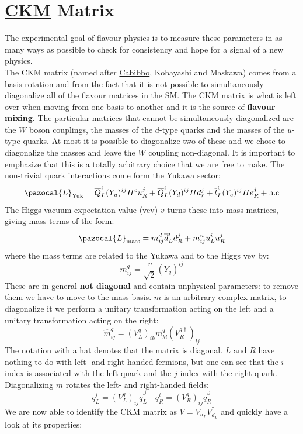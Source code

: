\documentclass[../main.tex]{subfiles}
\begin{document}
\section{\href{https://en.wikipedia.org/wiki/Cabibbo-Kobayashi-Maskawa_matrix}{CKM} Matrix}
The experimental goal of flavour physics is to measure these parameters in as many ways as possible to check for consistency and hope for a signal of a new physics.\\
The CKM matrix (named after \href{https://it.wikipedia.org/wiki/Nicola_Cabibbo}{Cabibbo}, Kobayashi and Maskawa) comes from a basis rotation and from the fact that it is not possible to simultaneously diagonalize all of the flavour matrices in the SM. The CKM matrix is what is left over when moving from one basis to another and it is the source of \textbf{flavour mixing}. The
particular matrices that cannot be simultaneously diagonalized are the $W$ boson couplings, the masses of the $d$-type quarks and the masses of the $u$-type quarks. At most it is possible to diagonalize two of these and we chose to diagonalize the masses and leave the $W$ coupling non-diagonal. It is
important to emphasize that this is a totally arbitrary choice that we are free to make. The non-trivial quark interactions come form the Yukawa sector:
\[
\pazocal{L}_{\text{Yuk}}=\overline{Q}_L^i(Y_u)^{ij}H^cu_R^j+\overline{Q}_L^i(Y_d)^{ij}Hd_r^j+\overline{l}_L^i(Y_e)^{ij}He_R^j+\text{h.c}
\]
The Higgs vacuum expectation value (vev) $v$ turns these into mass matrices, giving mass terms of the form:
\[
\pazocal{L}_{\text{mass}}=m_{ij}^d\overline{d}_L^id_R^j+m_{ij}^u\overline{u}_L^iu_R^j
\]
where the mass terms are related to the Yukawa and to the Higgs vev by:
\[
m_{ij}^q=\frac{v}{\sqrt{2}}(Y_q)^{ij}
\]
These are in general \textbf{not diagonal} and contain unphysical parameters: to remove them we have to move to the mass basis. $m$ is an arbitrary complex matrix, to diagonalize it we perform a unitary transformation acting on the left and a unitary transformation acting on the right:
\[
\hat{m}_{ij}^q=(V_L^q)_{ik}m_{kl}^q(V_R^{q\dagger})_{lj}
\]
The notation with a hat denotes that the matrix is diagonal. $L$ and $R$ have nothing to do with left- and right-handed fermions, but one can see that the $i$ index is associated with the left-quark and the $j$ index with the right-quark. Diagonalizing $m$ rotates the left- and right-handed fields:
\[
q_L^i=(V_L^q)_{ij}q_L^{'^j} \quad q_R^i=(V_R^q)_{ij}q_R^{'^j}
\]
We are now able to identify the CKM matrix as $V=V_{u_L}V_{d_L}^\dagger$ and quickly have a look at its properties:
\end{document}
